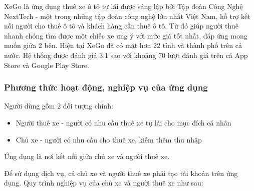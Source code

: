 \documentclass[../main.tex]{subfiles}
\begin{document}
	XeGo là ứng dụng thuê xe ô tô tự lái được sáng lập bởi Tập đoàn Công Nghệ NextTech - một trong những tập đoàn
	công nghệ lớn nhất Việt Nam, hỗ trợ kết nối người cho thuê ô tô và khách hàng cần thuê ô tô. Từ đó giúp người
	thuê nhanh chóng tìm được một chiếc xe ưng ý với mức giá tốt nhất, đáp ứng mong muốn giữa 2 bên. Hiện tại XeGo
	đã có mặt hơn 22 tỉnh và thành phố trên cả nước. Hệ thống được đánh giá 3.1 sao với khoảng 70 lượt đánh giá trên
	cả App Store và Google Play Store.

	\subsubsection{\textbf{Phương thức hoạt động, nghiệp vụ của ứng dụng}}

	Người dùng gồm 2 đối tượng chính:
	\begin{itemize}
		\item Người thuê xe - người có nhu cầu thuê xe tự lái cho mục đích cá nhân
		\item Chủ xe - người có nhu cầu cho thuê xe, kiếm thêm thu nhập
	\end{itemize}

	Ứng dụng là nơi kết nối giữa chủ xe và người thuê xe.

	Để sử dụng dịch vụ, cả chủ xe và người thuê xe phải tạo tài khoản trên ứng dụng. Quy trình nghiệp vụ của chủ xe
	và người thuê xe như sau:
\end{document}
